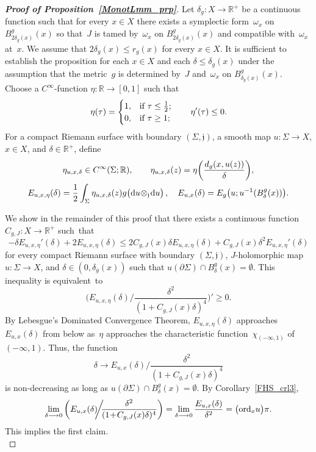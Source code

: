 \documentclass[11pt]{article}
\numberwithin{equation}{section}
\theoremstyle{definition}
\def\BE#1{\begin{equation}\label{#1}}
\def\EE{\end{equation}}
\def\lra{\longrightarrow}
\def\fj{\mathfrak j}
\def\R{\mathbb R}
\def\de{\delta}
\def\om{\omega}
\def\Si{\Sigma}
\def\eset{\emptyset}
\def\i{\infty}
\def\prt{\partial}
\def\nd{\textnormal{d}}
\def\ord{\textnormal{ord}}
\begin{document}
\begin{proof}[{\bf\emph{Proof of Proposition~\ref{MonotLmm_prp}}}]
Let $\de_g\!:X\!\lra\!\R^+$ be a continuous function such that for every $x\!\in\!X$
there exists a symplectic form~$\om_x$ on $B_{2\de_g(x)}^g(x)$
so that~$J$ is tamed by~$\om_x$ on $B_{2\de_g(x)}^g(x)$  
and compatible with~$\om_x$ at~$x$.
We assume that $2\de_g(x)\!\le\!r_g(x)$ for every $x\!\in\!X$.
It is sufficient to establish the proposition for each $x\!\in\!X$
and each $\de\!\le\!\de_g(x)$ under the assumption that 
the metric~$g$ is determined by~$J$ and~$\om_x$ on $B_{\de_g(x)}^g(x)$.\\

\noindent
Choose a $C^{\i}$-function $\eta\!:\R\!\lra\![0,1]$ such that 
\BE{etadfn_e}\eta(\tau)=\begin{cases}1,&\hbox{if}~\tau\le\frac12;\\
0,&\hbox{if}~\tau\ge1; \end{cases} \qquad
\eta'(\tau)\le0.\EE
For a compact Riemann surface with boundary $(\Si,\fj)$,
a smooth map \hbox{$u\!:\Si\!\lra\!X$},
$x\!\in\!X$, and $\de\!\in\!\R^+$, define
\begin{gather*}
\eta_{u,x,\de}\in C^{\i}(\Si;\R), \qquad
\eta_{u,x,\de}(z)=\eta\bigg(\frac{d_g(x,u(z))}{\de}\bigg),\\
E_{u,x,\eta}(\de)=\frac12\int_{\Si}
\eta_{u,x,\de}(z)g\big(\nd u\!\otimes_{\fj}\!\nd u\big)\,,\quad
E_{u,x}(\de)=E_g\big(u;u^{-1}(B_{\de}^g(x))\big).
\end{gather*}

\vspace{.2in}

\noindent
We show in the remainder of this proof that there exists a continuous function 
\hbox{$C_{g,J}\!:X\!\lra\!\R^+$} such~that 
\BE{Aetabd_e}
-\de E_{u,x,\eta}'(\de)+2E_{u,x,\eta}(\de)\le 
2C_{g,J}(x)\de E_{u,x,\eta}(\de)+C_{g,J}(x)\de^2 E_{u,x,\eta}'(\de)\EE
for every compact Riemann surface with boundary $(\Si,\fj)$,
$J$-holomorphic map \hbox{$u\!:\Si\!\lra\!X$}, and \hbox{$\de\!\in\!(0,\de_g(x))$}
such that $u(\prt\Si)\!\cap\!B_{\de}^g(x)\!=\!\eset$.
This inequality is equivalent~to
$$\bigg(E_{u,x,\eta}(\de)\bigg/\frac{\de^2}{(1\!+\!C_{g,J}(x)\de)^4}\bigg)'\ge 0.$$
By Lebesgue's Dominated Convergence Theorem, $E_{u,x,\eta}(\de)$ approaches~$E_{u,x}(\de)$
from below as~$\eta$ approaches the characteristic function~$\chi_{(-\i,1)}$ of~$(-\i,1)$.
Thus, the function
$$\de\lra E_{u,x}(\de)\bigg/\frac{\de^2}{(1\!+\!C_{g,J}(x)\de)^4}$$
is non-decreasing  as long as $u(\prt\Si)\!\cap\!B_{\de}^g(x)\!=\!\eset$.
By Corollary~\ref{FHS_crl3},
$$\lim_{\de\lra0}\bigg(E_{u,x}(\de)\!\!\bigg/\!\!\frac{\de^2}{(1\!+\!C_{g,J}(x)\de)^4}\bigg)
=\lim_{\de\lra0}\frac{E_{u,x}(\de)}{\de^2}=\big(\ord_xu\big)\pi.$$
This implies the first claim.\\


\end{proof}
\end{document}
